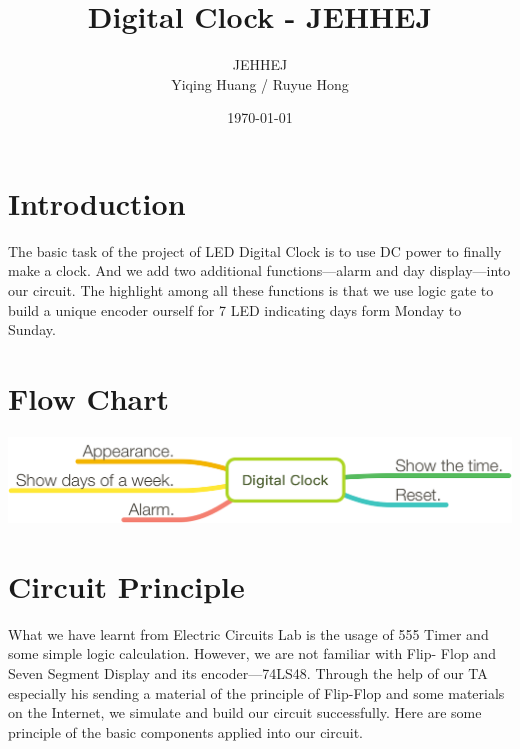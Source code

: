 \documentclass[12pt]{article}
\title{Digital Clock - JEHHEJ}
\author{JEHHEJ\\ Yiqing Huang / Ruyue Hong }
\date{\today}
\begin{document}
\maketitle

\tableofcontents
\clearpage

\section{Introduction}
	The basic task of the project of LED
Digital Clock is to use DC power to 
finally make a clock. And we add two
additional functions—alarm and day 
display—into our circuit. The highlight 
among all these functions is that we use
logic gate to build a unique encoder 
ourself for 7 LED indicating days form 
Monday to Sunday.
\section{Flow Chart}
\includegraphics[scale=0.75]{workflow}


\section{Circuit Principle}
What we have learnt from Electric 
Circuits Lab is the usage of 555 Timer 
and some simple logic calculation. 
However, we are not familiar with Flip-
Flop and Seven Segment Display and its 
encoder—74LS48. Through the help of our 
TA especially his sending a material of 
the principle of Flip-Flop and some 
materials on the Internet, we simulate 
and build our circuit successfully. Here 
are some principle of the basic 
components applied into our circuit.
\end{document}
